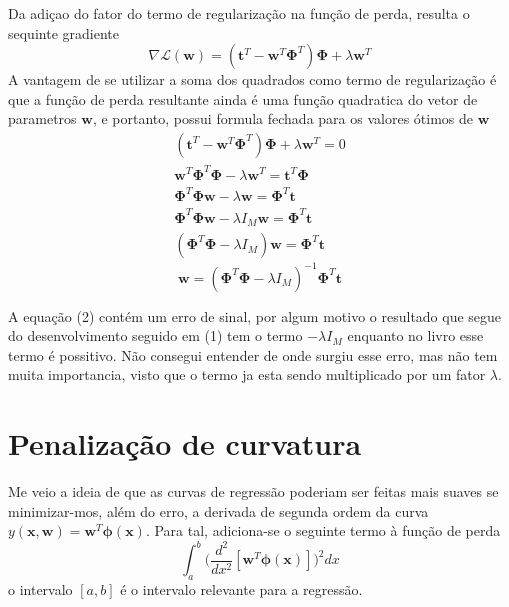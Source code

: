\documentclass{article}
\begin{document}
Da adiçao do fator do termo de regularização na função de perda, resulta o sequinte gradiente
\[
    \nabla \mathcal{L}(\textbf{w}) = (\textbf{t}^T - \textbf{w}^T \boldsymbol{\Phi}^T) \boldsymbol{\Phi} + \lambda \textbf{w}^T
\]
A vantagem de se utilizar a soma dos quadrados como termo de regularização é que a função de perda resultante
ainda é uma função quadratica do vetor de parametros \( \textbf{w} \), e portanto, possui formula fechada para
os valores ótimos de \( \textbf{w} \)
\begin{equation}
    \begin{aligned}
        (\textbf{t}^T - \textbf{w}^T \boldsymbol{\Phi}^T) \boldsymbol{\Phi} + \lambda \textbf{w}^T = 0               \\
        \textbf{w}^T \boldsymbol{\Phi}^T \boldsymbol{\Phi} - \lambda \textbf{w}^T = \textbf{t}^T \boldsymbol{\Phi}   \\
        \boldsymbol{\Phi}^T \boldsymbol{\Phi} \textbf{w}  - \lambda  \textbf{w} = \boldsymbol{\Phi}^T \textbf{t}     \\
        \boldsymbol{\Phi}^T \boldsymbol{\Phi} \textbf{w}  - \lambda I_M \textbf{w} = \boldsymbol{\Phi}^T \textbf{t}  \\
        (\boldsymbol{\Phi}^T \boldsymbol{\Phi} - \lambda I_M) \textbf{w} = \boldsymbol{\Phi}^T \textbf{t}       
    \end{aligned}     
\end{equation}
\begin{equation}
    \textbf{w} = (\boldsymbol{\Phi}^T \boldsymbol{\Phi} - \lambda I_M)^{-1} \boldsymbol{\Phi}^T \textbf{t}
\end{equation}

A equação (2) contém um erro de sinal, por algum motivo o resultado que segue do desenvolvimento seguido em (1) tem o termo
\( - \lambda I_M \) enquanto no livro esse termo é possitivo. Não consegui entender de onde surgiu esse erro, mas não tem muita
importancia, visto que o termo ja esta sendo multiplicado por um fator \( \lambda \).

\section{Penalização de curvatura}

Me veio a ideia de que as curvas de regressão poderiam ser feitas mais suaves se minimizar-mos, além do erro, a derivada
de segunda ordem da curva \( y(\textbf{x}, \textbf{w}) = \textbf{w}^T \boldsymbol{\phi}(\textbf{x}) \). Para tal, adiciona-se
o seguinte termo à função de perda
\begin{equation}
    \int_{a}^{b} \bigg( \frac{d^2}{dx^2} [ \textbf{w}^T \boldsymbol{\phi}(\textbf{x}) ] \bigg)^2 dx 
\end{equation}
o intervalo \( [a, b] \) é o intervalo relevante para a regressão.
\end{document}
